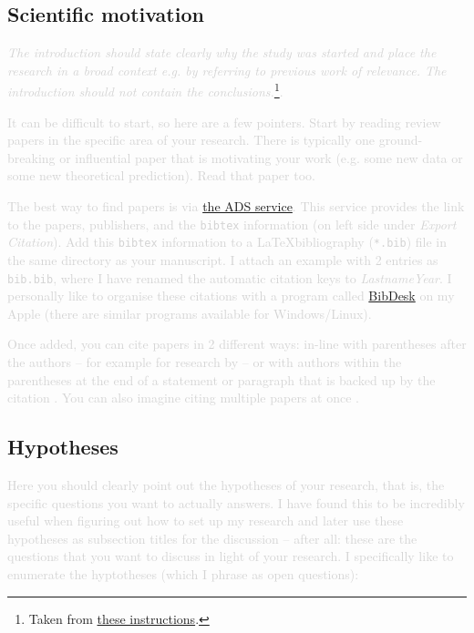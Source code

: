 \documentclass[twocolumn,apj,numberedappendix,appendixfloats]{openjournal}
\newcommand{\comment}[1]{\textcolor{lightgray}{#1}}
\begin{document}
\subsection{Scientific motivation}

\comment{\textit{The introduction should state clearly why the study was started and place the research in a broad context e.g. by referring to previous work of relevance. The introduction should not contain the conclusions.}\footnote{Taken from \href{https://www.aanda.org/doc_journal/instructions/aadoc.pdf}{these instructions}.}.}

\comment{It can be difficult to start, so here are a few pointers. Start by reading review papers in the specific area of your research. There is typically one ground-breaking or influential paper that is motivating your work (e.g. some new data or some new theoretical prediction). Read that paper too.}

\comment{The best way to find papers is via \href{https://ui.adsabs.harvard.edu}{the ADS service}. This service provides the link to the papers, publishers, and the \texttt{bibtex} information (on left side under \textit{Export Citation}). Add this \texttt{bibtex} information to a \LaTeX bibliography (\texttt{*.bib}) file in the same directory as your manuscript. I attach an example with 2 entries as \texttt{bib.bib}, where I have renamed the automatic citation keys to \textit{LastnameYear}. I personally like to organise these citations with a program called \href{https://bibdesk.sourceforge.io}{BibDesk} on my Apple (there are similar programs available for Windows/Linux).}

\comment{Once added, you can cite papers in 2 different ways: in-line with parentheses after the authors -- for example for research by \citet{Buder2024b} -- or with authors within the parentheses at the end of a statement or paragraph that is backed up by the citation \citep{Buder2024b}. You can also imagine citing multiple papers at once \citep[e.g.][]{Buder2018, Buder2019, Buder2021, Buder2022, Buder2024b}.}

\subsection{Hypotheses} \label{sec:hypotheses}

\comment{Here you should clearly point out the hypotheses of your research, that is, the specific questions you want to actually answers. I have found this to be incredibly useful when figuring out how to set up my research and later use these hypotheses as subsection titles for the discussion -- after all: these are the questions that you want to discuss in light of your research. I specifically like to enumerate the hyptotheses (which I phrase as open questions):}
\end{document}
